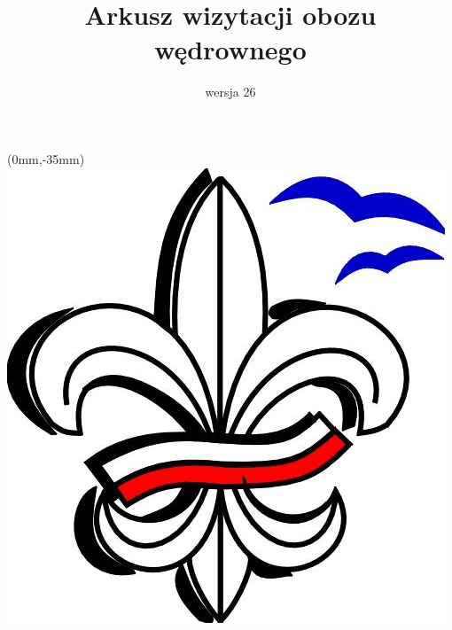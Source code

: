 \documentclass[a4paper,10pt,notitlepage,twoside]{article}
\title{Arkusz wizytacji obozu wędrownego}
\author{\scriptsize wersja 26} %
\date{} %
\begin{document}
\renewcommand{\headwidth}{18cm} %


\maketitle
\thispagestyle{fancy} %

\begin{textblock*}{20mm}(0mm,-35mm)
\includegraphics[scale=0.15]{lilijka_opom.jpg}
\end{textblock*}
\end{document}
